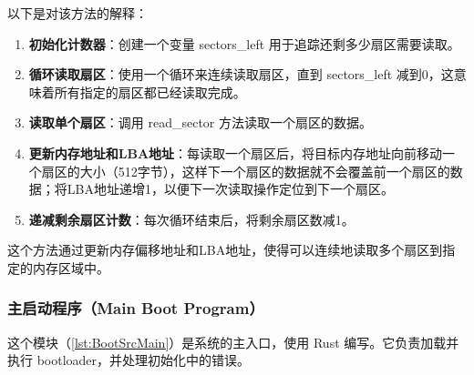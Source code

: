 以下是对该方法的解释：

\begin{enumerate}
    \item \textbf{初始化计数器}：创建一个变量 sectors\_left 用于追踪还剩多少扇区需要读取。
    \item \textbf{循环读取扇区}：使用一个循环来连续读取扇区，直到 sectors\_left 减到0，这意味着所有指定的扇区都已经读取完成。
    \item \textbf{读取单个扇区}：调用 read\_sector 方法读取一个扇区的数据。
    \item \textbf{更新内存地址和LBA地址}：每读取一个扇区后，将目标内存地址向前移动一个扇区的大小（512字节），这样下一个扇区的数据就不会覆盖前一个扇区的数据；将LBA地址递增1，以便下一次读取操作定位到下一个扇区。
    \item \textbf{递减剩余扇区计数}：每次循环结束后，将剩余扇区数减1。
\end{enumerate}

这个方法通过更新内存偏移地址和LBA地址，使得可以连续地读取多个扇区到指定的内存区域中。

\subsubsection{主启动程序（Main Boot Program）}

这个模块（\cref{lst:BootSrcMain}）是系统的主入口，使用 Rust 编写。它负责加载并执行 bootloader，并处理初始化中的错误。

